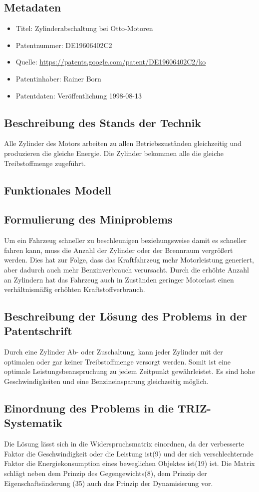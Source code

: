 \documentclass{article}
\begin{document}
\subsection{Metadaten}
\begin{itemize}\itemsep0pt
\item Titel: Zylinderabschaltung bei Otto-Motoren
\item Patentnummer: DE19606402C2
\item Quelle: \url{https://patents.google.com/patent/DE19606402C2/ko}
\item Patentinhaber:  Rainer Born 
\item Patentdaten: Veröffentlichung 1998-08-13

\end{itemize}
\subsection{Beschreibung des Stands der Technik}
Alle Zylinder des Motors arbeiten zu allen Betriebszuständen gleichzeitig und produzieren die gleiche Energie. Die Zylinder bekommen alle die gleiche Treibstoffmenge zugeführt. 
\subsection{Funktionales Modell}

\subsection{Formulierung des Miniproblems}
Um ein Fahrzeug schneller zu beschleunigen beziehungsweise damit es schneller fahren kann, muss die Anzahl der Zylinder oder der Brennraum vergrößert werden. Dies hat zur Folge, dass das Kraftfahrzeug mehr Motorleistung generiert, aber dadurch auch mehr Benzinverbrauch verursacht. 
Durch die erhöhte Anzahl an Zylindern hat das Fahrzeug auch in Zuständen geringer Motorlast einen verhältnismäßig erhöhten Kraftstoffverbrauch.
\subsection{Beschreibung der Lösung des Problems in der Patentschrift}
Durch eine Zylinder Ab- oder Zuschaltung, kann jeder Zylinder mit der optimalen oder gar keiner Treibstoffmenge versorgt werden.
Somit ist eine optimale Leistungsbeanspruchung zu jedem Zeitpunkt gewährleistet.
Es sind hohe Geschwindigkeiten und eine Benzineinsparung gleichzeitig möglich. 

\subsection{Einordnung des Problems in die TRIZ-Systematik}
Die Lösung lässt sich in die Widerspruchsmatrix  einordnen, da der verbesserte Faktor die Geschwindigkeit oder die Leistung ist(9) und der sich verschlechternde Faktor die Energiekonsumption eines beweglichen Objektes ist(19) ist. Die Matrix schlägt neben dem Prinzip des Gegengewichts(8), dem Prinzip der Eigenschaftsänderung (35) auch das Prinzip der Dynamisierung vor. 
\end{document}
